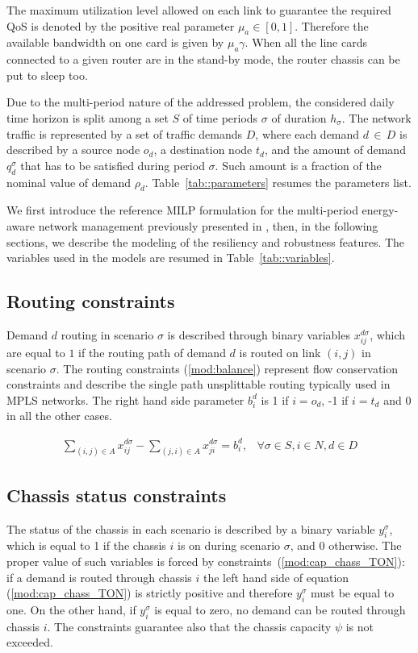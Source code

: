\documentclass[final,5p,times,twocolumn]{elsarticle}
\begin{document}
The maximum utilization level allowed on each link to guarantee the required QoS is denoted by the positive real parameter $\mu_a \in \left[0,1 \right]$. Therefore the available bandwidth on one card is given by $\mu_a \gamma$. When all the line cards connected to a given router are in the stand-by mode, the router chassis can be put to sleep too.  

Due to the multi-period nature of the addressed problem, the considered daily time horizon is split among a set $S$ of time periods $\sigma$ of duration $h_{\sigma}$. The network traffic is represented by a set of traffic demands $D$, where each demand $d\, \in \, D$ is described by a source node $o_d$, a destination node $t_d$, and the amount of demand $q_d^{\sigma}$ that has to be satisfied during period $\sigma$. Such amount is a fraction of the nominal value of demand $\rho_d$. 
Table~\ref{tab::parameters} resumes the parameters list.

We first introduce the reference MILP formulation for the multi-period energy-aware network management previously presented in \cite{addis13a}, then, in the following sections, we describe the modeling of the resiliency and robustness features. The variables used in the models are resumed in Table~\ref{tab::variables}.


\subsection{Routing constraints}
Demand $d$  routing in scenario $\sigma$ is described through binary variables $x_{ij}^{d\sigma}$, which are equal to $1$ if the routing path of demand $d$ is routed on link $(i,j)$ in scenario $\sigma$. The routing constraints (\ref{mod:balance}) represent flow conservation constraints and describe the single path unsplittable routing typically used in MPLS networks. The right hand side parameter $b_i^d$ is 1 if $i = o_d$, -1 if $i = t_d$  and 0 in all the other cases.

\begin{eqnarray}
\label{mod:balance}\sum_{(i,j) \in A} x_{ij}^{d \sigma} - \sum_{(j,i)\in A} x_{ji}^{d \sigma}= b_i^d, &
\forall \sigma \in S, i \in N, d \in D 
\end{eqnarray}

\subsection{Chassis status constraints}
The status of the chassis in each scenario is described by a binary variable $y_i^{\sigma}$, which is equal to 1 if the chassis  $i$ is on during scenario $\sigma$, and 0 otherwise. The proper value of such variables is forced by constraints~(\ref{mod:cap_chass_TON}): if a demand is routed through chassis $i$ the left hand side of equation (\ref{mod:cap_chass_TON}) is strictly positive and therefore $y_i^{\sigma}$ must be equal to one. On the other hand, if $y_i^{\sigma}$ is equal to zero, no demand can be routed through chassis $i$. The constraints guarantee also that the chassis capacity $\psi$ is not exceeded.
\end{document}
